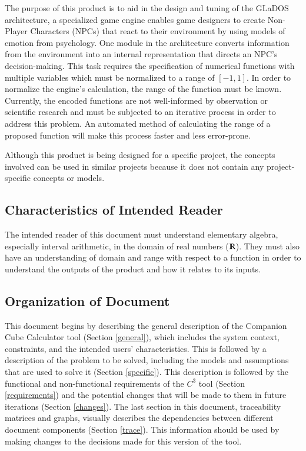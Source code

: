 \documentclass[12pt]{article}
\newcommand{\progname}{Companion Cube Calculator} %
\newcommand{\prognameAbbrv}{$C^{3}$}
\begin{document}
The purpose of this product is to aid in the design and tuning of the GLaDOS 
architecture, a specialized game engine enables game designers to create 
Non-Player Characters (NPCs) that react to their environment by using models of 
emotion from psychology. One module in the architecture converts information 
from the environment into an internal representation that directs an NPC's 
decision-making. This task requires the specification of numerical functions 
with multiple variables which must be normalized to a range of $[-1,1]$. In 
order to normalize the engine's calculation, the range of the function must be 
known. Currently, the encoded functions are not well-informed by observation or 
scientific research and must be subjected to an iterative process in order to 
address this problem. An automated method of calculating the range of a 
proposed function will make this process faster and less error-prone.

Although this product is being designed for a specific project, the concepts 
involved can be used in similar projects because it does not contain any 
project-specific concepts or models.

\subsection{Characteristics of Intended Reader}
\label{intro_reader}
The intended reader of this document must understand elementary algebra, 
especially interval arithmetic, in the domain of real numbers 
($\varmathbb{R}$). They must also have an understanding of domain and range 
with respect to a function in order to understand the outputs of the product 
and how it relates to its 
inputs.

\subsection{Organization of Document}
This document begins by describing the general description of the \progname{} 
tool (Section \ref{general}), which includes the system context, constraints, 
and the intended users' characteristics. This is followed by a description of 
the problem to be solved, including the models and assumptions that are used to 
solve it (Section \ref{specific}). This description is followed by the 
functional and non-functional requirements of the \prognameAbbrv{} tool 
(Section \ref{requirements}) and the potential changes that will be made to 
them in future iterations (Section \ref{changes}). The last section in this 
document, traceability matrices and graphs, visually describes the dependencies 
between different document components (Section \ref{trace}). This information 
should be used by making changes to the decisions made for this version of the 
tool.
\end{document}
